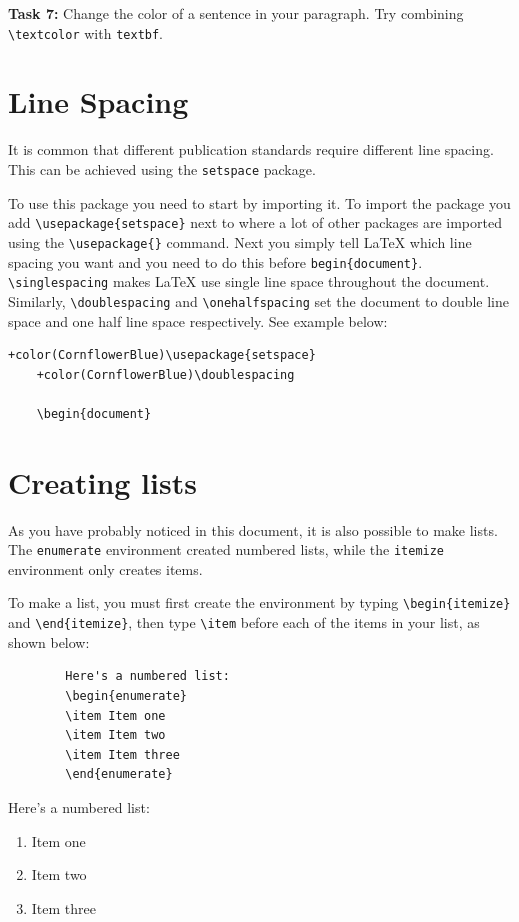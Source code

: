 \documentclass[12pts]{article}
\begin{document}
	\textcolor{BurntOrange}{\textbf{Task 7:}} Change the color of a sentence in your paragraph. Try combining \verb|\textcolor| with \verb|textbf|.
	
	\section{Line Spacing}
	It is common that different publication standards require different line spacing. This can be achieved using the \texttt{setspace} package. 
	
	To use this package you need to start by importing it. To import the package you add \verb|\usepackage{setspace}| next to where a lot of other packages are imported using the  \verb|\usepackage{}| command. Next you simply tell {\LaTeX} which line spacing you want and you need to do this before \verb|begin{document}|. \verb|\singlespacing| makes {\LaTeX} use single line space throughout the document. Similarly, \verb|\doublespacing| and \verb|\onehalfspacing| set the document to double line space and one half line space respectively. See example below:
	
	\begin{Verbatim}[commandchars=+\(\)]
	+color(CornflowerBlue)\usepackage{setspace}
	+color(CornflowerBlue)\doublespacing
	
	\begin{document}
	\end{Verbatim}
	
	\section{Creating lists}
	
	As you have probably noticed in this document, it is also possible to make lists. The \texttt{enumerate} environment created numbered lists, while the \texttt{itemize} environment only creates items.
	
	To make a list, you must first create the environment by typing \verb|\begin{itemize}| and \verb|\end{itemize}|, then type \verb|\item| before each of the items in your list, as shown below:
	
	\begin{multicols}{2}
		\begin{Verbatim}
		Here's a numbered list:
		\begin{enumerate}
		\item Item one
		\item Item two
		\item Item three
		\end{enumerate}
		\end{Verbatim}
		
		\columnbreak	
		
		Here's a numbered list:
		\begin{enumerate}
			\item Item one
			\item Item two
			\item Item three
		\end{enumerate}
	\end{multicols}
	
\end{document}
